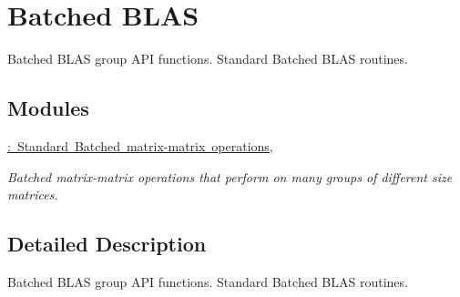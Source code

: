 \hypertarget{group__group__batched__blas}{}\section{Batched B\+L\+AS}
\label{group__group__batched__blas}


Batched B\+L\+AS group A\+PI functions. Standard Batched B\+L\+AS routines.  


\subsection*{Modules}
\begin{DoxyCompactItemize}
\item 
\mbox{\hyperlink{group__group__blas3}{\+: Standard Batched matrix-\/matrix operations,}}
\begin{DoxyCompactList}\small\item\em Batched matrix-\/matrix operations that perform on many groups of different size matrices. \end{DoxyCompactList}\end{DoxyCompactItemize}


\subsection{Detailed Description}
Batched B\+L\+AS group A\+PI functions. Standard Batched B\+L\+AS routines. 



